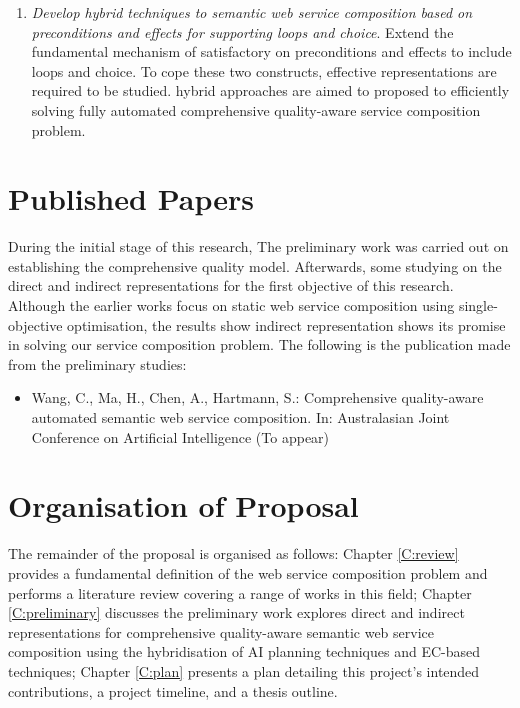 \begin{enumerate}
\begin{enumerate}
    
   \item \emph{Develop hybrid techniques to semantic web service composition based on preconditions and effects for supporting loops and choice}. Extend the fundamental mechanism of satisfactory on preconditions and effects to include loops and choice. To cope these two constructs, effective representations are required to be studied. hybrid approaches are aimed to proposed to efficiently solving fully automated comprehensive quality-aware service composition problem.

 
 \end{enumerate}
 
\end{enumerate}

\section{Published Papers}

During the initial stage of this research, The preliminary work was carried out on establishing the comprehensive quality model.  Afterwards, some studying on the direct and indirect representations for the first objective of this research. Although the earlier works focus on static web service composition using single-objective optimisation, the results show indirect representation shows its promise in solving our service composition problem.  The following is the publication made from the preliminary studies:

\begin{itemize}
 \item Wang, C., Ma, H., Chen, A., Hartmann, S.: Comprehensive quality-aware automated semantic web service composition. In: Australasian Joint Conference on Artificial Intelligence (To appear)
\end{itemize}


\section{Organisation of Proposal}The remainder of the proposal is organised as follows: Chapter \ref{C:review} provides a fundamental definition of the web service composition problem and performs a literature review covering a range of works in this field; Chapter \ref{C:preliminary} discusses the preliminary work explores direct and indirect representations for comprehensive quality-aware semantic web service composition using the hybridisation of AI planning techniques and EC-based techniques; Chapter \ref{C:plan} presents a plan detailing this project's intended contributions, a project timeline, and a thesis outline.

